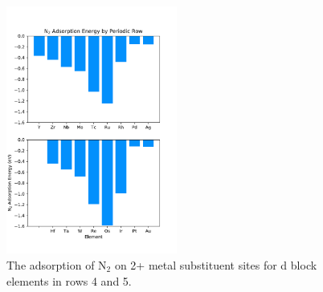 

\begin{figure}
    
    \centering
    \includegraphics[width=0.5\textwidth]{Images/N2_adsorption_rows.pdf}
    \caption{The adsorption of N$_2$ on 2+ metal substituent sites for d block elements in rows 4 and 5.}
    \label{fig:N2_rows}
\end{figure}

